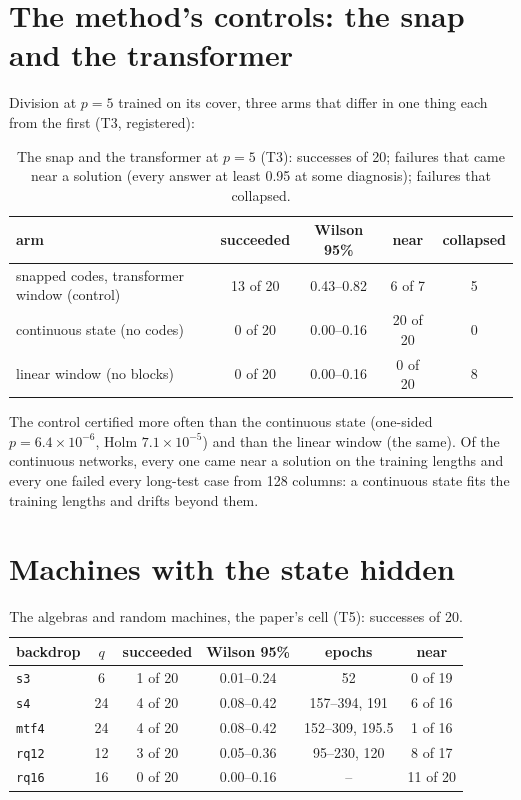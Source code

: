 \documentclass[11pt]{article}
\newcommand{\pn}[2]{#2}
\begin{document}
\section{The method's controls: the snap and the transformer}
\label{app:controls}

Division at $p = 5$ trained on its cover, three arms that differ in one thing each from the first
(T3, registered):

\begin{table}[t]
\centering
\caption{The snap and the transformer at $p = 5$ (T3): successes of 20; failures that came near a solution (every answer at least 0.95 at some diagnosis); failures that collapsed.}
\label{tab:baselines}
\begin{tabular}{lcccc}
\toprule
arm & succeeded & Wilson 95\% & near & collapsed \\
\midrule
snapped codes, transformer window (control) & 13 of 20 & 0.43--0.82 & 6 of 7 & 5 \\
continuous state (no codes) & 0 of 20 & 0.00--0.16 & 20 of 20 & 0 \\
linear window (no blocks) & 0 of 20 & 0.00--0.16 & 0 of 20 & 8 \\
\bottomrule
\end{tabular}
\end{table}

The control certified more often than the continuous state (one-sided
$p = \pn{k3.continuous-p}{6.4 \times 10^{-6}}$, Holm $\pn{k3.continuous-holm}{7.1 \times 10^{-5}}$)
and than the linear window (\pn{k3.linear-same}{the same}). Of the continuous networks,
\pn{k3.continuous-near}{every} one came near a solution on the training lengths and
\pn{k3.continuous-failed}{every} one failed every long-test case from \pn{k3.continuous-from}{128}
columns: a
continuous state fits the training lengths and drifts beyond them.

\section{Machines with the state hidden}
\label{app:hidden}

\begin{table}[t]
\centering
\caption{The algebras and random machines, the paper's cell (T5): successes of 20.}
\label{tab:breadth}
\begin{tabular}{lccccc}
\toprule
backdrop & $q$ & succeeded & Wilson 95\% & epochs & near \\
\midrule
\texttt{s3} & 6 & 1 of 20 & 0.01--0.24 & 52 & 0 of 19 \\
\texttt{s4} & 24 & 4 of 20 & 0.08--0.42 & 157--394, 191 & 6 of 16 \\
\texttt{mtf4} & 24 & 4 of 20 & 0.08--0.42 & 152--309, 195.5 & 1 of 16 \\
\texttt{rq12} & 12 & 3 of 20 & 0.05--0.36 & 95--230, 120 & 8 of 17 \\
\texttt{rq16} & 16 & 0 of 20 & 0.00--0.16 & -- & 11 of 20 \\
\bottomrule
\end{tabular}
\end{table}
\end{document}
